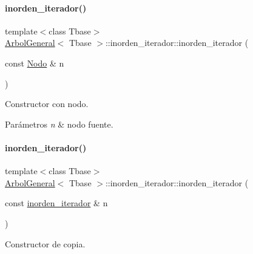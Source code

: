 \paragraph{\texorpdfstring{inorden\+\_\+iterador()}{inorden\_iterador()}\hspace{0.1cm}{\footnotesize\ttfamily [2/3]}}
{\footnotesize\ttfamily template$<$class Tbase$>$ \\
\hyperlink{classArbolGeneral}{Arbol\+General}$<$ Tbase $>$\+::inorden\+\_\+iterador\+::inorden\+\_\+iterador (\begin{DoxyParamCaption}\item[{const \hyperlink{classArbolGeneral_a12cc1b74a9095d89bc7334290d332f7a}{Nodo} \&}]{n }\end{DoxyParamCaption})\hspace{0.3cm}{\ttfamily [inline]}}



Constructor con nodo. 


\begin{DoxyParams}{Parámetros}
{\em n} & nodo fuente. \\
\hline
\end{DoxyParams}
\hypertarget{classArbolGeneral_1_1inorden__iterador_a35353196b9e723891d499a54ac19f8de}{}\label{classArbolGeneral_1_1inorden__iterador_a35353196b9e723891d499a54ac19f8de} 
\paragraph{\texorpdfstring{inorden\+\_\+iterador()}{inorden\_iterador()}\hspace{0.1cm}{\footnotesize\ttfamily [3/3]}}
{\footnotesize\ttfamily template$<$class Tbase$>$ \\
\hyperlink{classArbolGeneral}{Arbol\+General}$<$ Tbase $>$\+::inorden\+\_\+iterador\+::inorden\+\_\+iterador (\begin{DoxyParamCaption}\item[{const \hyperlink{classArbolGeneral_1_1inorden__iterador}{inorden\+\_\+iterador} \&}]{n }\end{DoxyParamCaption})\hspace{0.3cm}{\ttfamily [inline]}}



Constructor de copia. 


